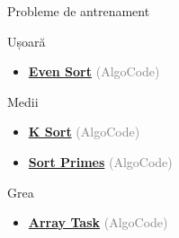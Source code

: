 \documentclass{beamer}
\begin{document}
\begin{frame}{Probleme de antrenament}
  \begin{block}{Ușoară}
    \begin{itemize}
      \item \href{https://code.algolymp.com/problems/1081}{\textbf{Even Sort}} {\footnotesize\textcolor{gray}{(AlgoCode)}}
    \end{itemize}
  \end{block}
  \begin{block}{Medii}
    \begin{itemize}
      \item \href{https://code.algolymp.com/problems/1077}{\textbf{K Sort}} {\footnotesize\textcolor{gray}{(AlgoCode)}}
      \item \href{https://code.algolymp.com/problems/1076}{\textbf{Sort Primes}} {\footnotesize\textcolor{gray}{(AlgoCode)}}
    \end{itemize}
  \end{block}
  \begin{block}{Grea}
    \begin{itemize}
      \item \href{https://code.algolymp.com/problems/1082}{\textbf{Array Task}} {\footnotesize\textcolor{gray}{(AlgoCode)}}
    \end{itemize}
  \end{block}
\end{frame}
\end{document}
